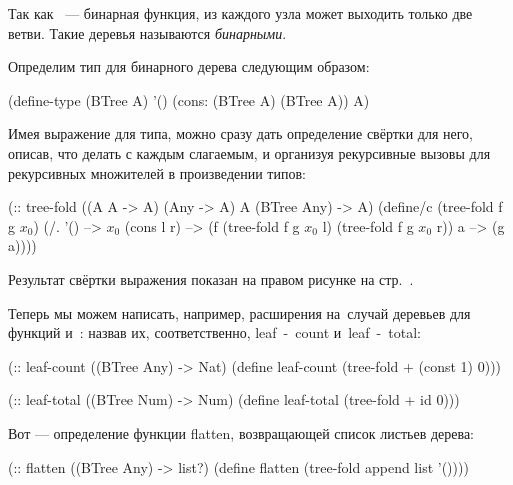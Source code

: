 Так как ~--- бинарная функция, из каждого узла может выходить только две ветви. Такие деревья называются \emph{бинарными}. 

Определим тип для бинарного дерева следующим образом:
\begin{Definition}
(define-type (BTree A)
  '()
  (cons: (BTree A) (BTree A))
  A)
\end{Definition}

Имея выражение для типа, можно сразу дать определение свёртки для него, описав, что делать с каждым слагаемым, и организуя рекурсивные вызовы для рекурсивных множителей в произведении типов:
\begin{Definition}[emph={f,g,a,l,r}]
(:: tree-fold ((A A -> A) (Any -> A) A (BTree Any) -> A)
 (define/c (tree-fold f g $x_0$)
   (/. '() --> $x_0$
       (cons l r) --> (f (tree-fold f g $x_0$ l) 
                        (tree-fold f g $x_0$ r))
       a --> (g a))))
\end{Definition}
Результат свёртки выражения  показан на правом рисунке на стр.~\pageref{fig:tree}.

Теперь мы можем написать, например, расширения на~случай деревьев для функций  и~: назвав их, соответственно, \si{leaf-count} и~\si{leaf-total}:

\begin{SchemeCode}
(:: leaf-count ((BTree Any) -> Nat)
 (define leaf-count 
   (tree-fold + (const 1) 0)))

(:: leaf-total ((BTree Num) -> Num)
 (define leaf-total 
   (tree-fold + id 0)))
\end{SchemeCode}

Вот --- определение функции \si{flatten}, возвращающей список листьев дерева:
\begin{SchemeCode}
(:: flatten ((BTree Any) -> list?)
 (define flatten 
   (tree-fold append list '())))
\end{SchemeCode}

